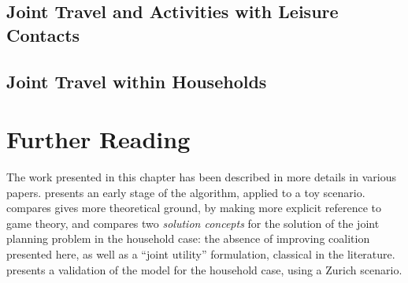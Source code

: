 {\subsection{Joint Travel and Activities with Leisure Contacts\label{sec:td:resultssn}}


\subsection{Joint Travel within Households\label{sec:td:resultshh}}

\section{Further Reading}
The work presented in this chapter has been described in more details in various papers.
presents an early stage of the algorithm, applied to a toy scenario.
compares gives more theoretical ground,
by making more explicit reference to game theory,
and compares two \emph{solution concepts} for
the solution of the joint planning problem in the household case:
the absence of improving coalition presented here,
as well as a ``joint utility'' formulation,
classical in the literature.
presents a validation of the model for the household case,
using a Zurich scenario.

} %
